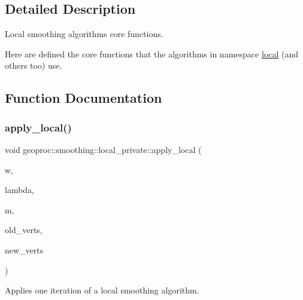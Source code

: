 \subsection{Detailed Description}
Local smoothing algorithms core functions. 

Here are defined the core functions that the algorithms in namespace \hyperlink{namespacegeoproc_1_1smoothing_1_1local}{local} (and others too) use. 

\subsection{Function Documentation}
\mbox{\label{namespacegeoproc_1_1smoothing_1_1local__private_a233a9fc9782e2064cbd1c7006485a865}} 
\subsubsection{\texorpdfstring{apply\+\_\+local()}{apply\_local()}\hspace{0.1cm}{\footnotesize\ttfamily [1/2]}}
{\footnotesize\ttfamily void geoproc\+::smoothing\+::local\+\_\+private\+::apply\+\_\+local (\begin{DoxyParamCaption}\item[{const \hyperlink{namespacegeoproc_a12e5a10581b53b9dd9a509127527f843}{weight} \&}]{w,  }\item[{float}]{lambda,  }\item[{const \hyperlink{classgeoproc_1_1TriangleMesh}{Triangle\+Mesh} \&}]{m,  }\item[{const glm\+::vec3 $\ast$}]{old\+\_\+verts,  }\item[{glm\+::vec3 $\ast$}]{new\+\_\+verts }\end{DoxyParamCaption})}



Applies one iteration of a local smoothing algorithm. 


